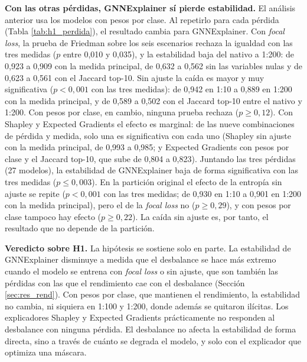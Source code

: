\textbf{Con las otras pérdidas, GNNExplainer sí pierde estabilidad.} El análisis anterior usa
los modelos con pesos por clase. Al repetirlo para cada pérdida (Tabla \ref{tab:h1_perdida}), el
resultado cambia para GNNExplainer. Con \textit{focal loss}, la prueba de Friedman sobre los
seis escenarios rechaza la igualdad con las tres medidas ($p$ entre 0,010 y 0,035), y la
estabilidad baja del nativo a 1:200: de 0,923 a 0,909 con la medida principal, de 0,632 a 0,562
sin las variables nulas y de 0,623 a 0,561 con el Jaccard top-10. Sin ajuste la caída es mayor
y muy significativa ($p < 0{,}001$ con las tres medidas): de 0,942 en 1:10 a 0,889 en 1:200 con
la medida principal, y de 0,589 a 0,502 con el Jaccard top-10 entre el nativo y 1:200. Con pesos
por clase, en cambio, ninguna prueba rechaza ($p \geq 0{,}12$). Con Shapley y Expected Gradients
el efecto es marginal: de las nueve combinaciones de pérdida y medida, solo una es
significativa con cada uno (Shapley sin ajuste con la medida principal, de 0,993 a 0,985; y
Expected Gradients con pesos por clase y el Jaccard top-10, que sube de 0,804 a 0,823). Juntando las tres
pérdidas (27 modelos), la estabilidad de GNNExplainer baja de forma significativa con las tres
medidas ($p \leq 0{,}003$). En la partición original el efecto de la entropía sin ajuste se
repite ($p < 0{,}001$ con las tres medidas; de 0,930 en 1:10 a 0,901 en 1:200 con la medida
principal), pero el de la \textit{focal loss} no ($p \geq 0{,}29$), y con pesos por clase tampoco
hay efecto ($p \geq 0{,}22$). La caída sin ajuste es, por tanto, el resultado que no depende de
la partición.

\begin{table}[ht]
\centering
\caption{Estabilidad entre réplicas por escenario y pérdida (GraphSAGE, GAT y TAGCN; media de
9 modelos por celda).}
\label{tab:h1_perdida}
\scriptsize
\setlength{\tabcolsep}{3pt}

\end{table}

\textbf{Veredicto sobre H1.} La hipótesis se sostiene solo en parte. La estabilidad de
GNNExplainer disminuye a medida que el desbalance se hace más extremo cuando el modelo se
entrena con \textit{focal loss} o sin ajuste, que son también las pérdidas con las que el
rendimiento cae con el desbalance (Sección \ref{sec:res_rend}). Con pesos por clase, que
mantienen el rendimiento, la estabilidad no cambia, ni siquiera en 1:100 y 1:200, donde además
se quitaron ilícitas. Los explicadores Shapley y Expected Gradients prácticamente no responden al
desbalance con ninguna pérdida. El desbalance no afecta la estabilidad de forma directa, sino a
través de cuánto se degrada el modelo, y solo con el explicador que optimiza una máscara.

